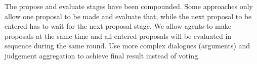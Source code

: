 The propose and evaluate stages have been compounded. Some approaches only
allow one proposal to be made and evaluate that, while the next proposal to be
entered has to wait for the next proposal stage. We allow agents to make
proposals at the same time and all entered proposals will be evaluated in
sequence during the same round. Use more complex dialogues (arguments) and
judgement aggregation to achieve final result instead of voting.
